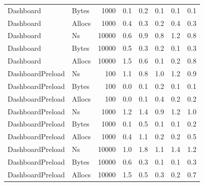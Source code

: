 \begin{table}[ht]
\begin{tabular}{llrrrrrr}
	Dashboard & Bytes & 1000 &  0.1 &  0.2 &  0.1 &  0.1 &  0.1 \\
	Dashboard & Allocs & 1000 &  0.4 &  0.3 &  0.2 &  0.4 &  0.3 \\
	Dashboard & Ns & 10000 &  0.6 &  0.9 &  0.8 &  1.2 &  0.8 \\
	Dashboard & Bytes & 10000 &  0.5 &  0.3 &  0.2 &  0.1 &  0.3 \\
	Dashboard & Allocs & 10000 &  1.5 &  0.6 &  0.1 &  0.2 &  0.8 \\
	DashboardPreload & Ns & 100 &  1.1 &  0.8 &  1.0 &  1.2 &  0.9 \\
	DashboardPreload & Bytes & 100 &  0.0 &  0.1 &  0.2 &  0.1 &  0.1 \\
	DashboardPreload & Allocs & 100 &  0.0 &  0.1 &  0.4 &  0.2 &  0.2 \\
	DashboardPreload & Ns & 1000 &  1.2 &  1.4 &  0.9 &  1.2 &  1.0 \\
	DashboardPreload & Bytes & 1000 &  0.1 &  0.5 &  0.1 &  0.1 &  0.2 \\
	DashboardPreload & Allocs & 1000 &  0.4 &  1.1 &  0.2 &  0.2 &  0.5 \\
	DashboardPreload & Ns & 10000 &  1.0 &  1.8 &  1.1 &  1.4 &  1.2 \\
	DashboardPreload & Bytes & 10000 &  0.6 &  0.3 &  0.1 &  0.1 &  0.3 \\
	DashboardPreload & Allocs & 10000 &  1.5 &  0.5 &  0.3 &  0.2 &  0.7 \\
\bottomrule
\end{tabular}
\label{tab:variationskoeffizienten_sqlx}
\end{table}
	